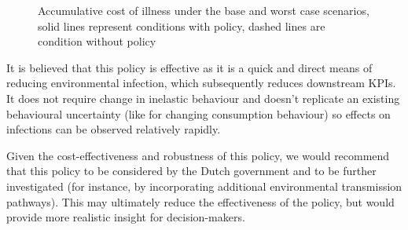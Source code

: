 \begin{figure}[h!]
\begin{minipage}{0.45\textwidth}
        \caption{Accumulative cost of illness under the base and worst case scenarios, solid lines represent conditions with policy, dashed lines are condition without policy}
        \label{fig:ec_bwc_acoi}
    \end{minipage}
\end{figure}

It is believed that this policy is effective as it is a quick and direct means of reducing environmental infection, which subsequently reduces downstream KPIs. It does not require change in inelastic behaviour and doesn't replicate an existing behavioural uncertainty (like for changing consumption behaviour) so effects on infections can be observed relatively rapidly.

Given the cost-effectiveness and robustness of this policy, we would recommend that this policy to be considered by the Dutch government and to be further investigated (for instance, by incorporating additional environmental transmission pathways). This may ultimately reduce the effectiveness of the policy, but would provide more realistic insight for decision-makers.

